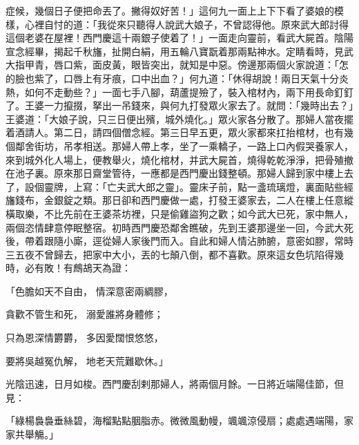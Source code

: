 症候，幾個日子便把命丟了。撇得奴好苦！」這何九一面上上下下看了婆娘的模樣，心裡自忖的道：「我從來只聽得人說武大娘子，不曾認得他。原來武大郎討得這個老婆在屋裡！西門慶這十兩銀子使着了！」一面走向靈前，看武大屍首。陰陽宣念經畢，揭起千秋旛，扯開白絹，用五輪八寶翫着那兩點神水。定睛看時，見武大指甲青，唇口紫，面皮黃，眼皆突出，就知是中惡。傍邊那兩個火家說道：「怎的臉也紫了，口唇上有牙痕，口中出血？」何九道：「休得胡說！兩日天氣十分炎熱，如何不走動些？」一面七手八腳，葫蘆提殮了，裝入棺材內，兩下用長命釘釘了。王婆一力攛掇，拏出一吊錢來，與何九打發眾火家去了。就問：「幾時出去？」王婆道：「大娘子說，只三日便出殯，城外燒化。」眾火家各分散了。那婦人當夜擺着酒請人。第二日，請四個僧念經。第三日早五更，眾火家都來扛抬棺材，也有幾個鄰舍街坊，吊孝相送。那婦人帶上孝，坐了一乘轎子，一路上口內假哭養家人，來到城外化人場上，便教舉火，燒化棺材，并武大屍首，燒得乾乾淨淨，把骨殖撤在池子裏。原來那日齋堂管待，一應都是西門慶出錢整頓。那婦人歸到家中樓上去了，設個靈牌，上寫：「亡夫武大郎之靈」。靈床子前，點一盞琉璃燈，裏面貼些經旛錢布，金銀錠之類。那日卻和西門慶做一處，打發王婆家去，二人在樓上任意縱橫取樂，不比先前在王婆茶坊裡，只是偷雞盜狗之歡；如今武大已死，家中無人，兩個恣情肆意停眠整宿。初時西門慶恐鄰舍瞧破，先到王婆那邊坐一回，今武大死後，帶着跟隨小廝，逕從婦人家後門而入。自此和婦人情沾肺腑，意密如膠，常時三五夜不曾歸去，把家中大小，丟的七顛八倒，都不喜歡。原來這女色坑陷得幾時，必有敗！有鷓鴣天為證：

「色膽如天不自由，  情深意密兩綢膠，

貪歡不管生和死，  溺愛誰將身體修；

只為恩深情欝欝，  多因愛闊恨悠悠，

要將吳越冤仇解，  地老天荒難歇休。」

光陰迅速，日月如梭。西門慶刮剌那婦人，將兩個月餘。一日將近端陽佳節，但見：

「綠楊裊裊垂絲碧，海榴點點胭脂赤。微微風動幔，颯颯涼侵扇；處處遇端陽，家家共舉觴。」

